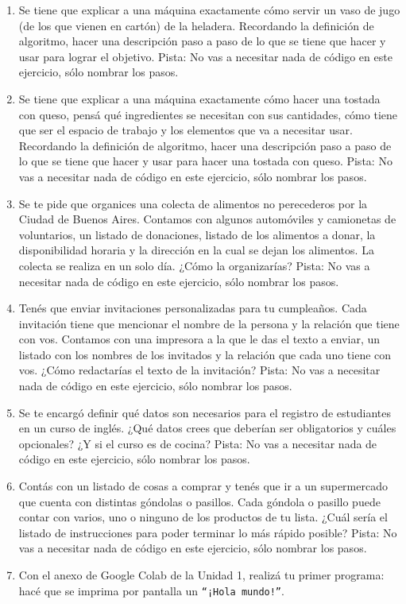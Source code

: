 \documentclass[
  letterpaper,
  DIV=11,
  numbers=noendperiod]{scrreprt}
\begin{document}
\begin{enumerate}
\def\labelenumi{\arabic{enumi}.}
\item
  Se tiene que explicar a una máquina exactamente cómo servir un vaso de
  jugo (de los que vienen en cartón) de la heladera. Recordando la
  definición de algoritmo, hacer una descripción paso a paso de lo que
  se tiene que hacer y usar para lograr el objetivo. Pista: No vas a
  necesitar nada de código en este ejercicio, sólo nombrar los pasos.
\item
  Se tiene que explicar a una máquina exactamente cómo hacer una tostada
  con queso, pensá qué ingredientes se necesitan con sus cantidades,
  cómo tiene que ser el espacio de trabajo y los elementos que va a
  necesitar usar. Recordando la definición de algoritmo, hacer una
  descripción paso a paso de lo que se tiene que hacer y usar para hacer
  una tostada con queso. Pista: No vas a necesitar nada de código en
  este ejercicio, sólo nombrar los pasos.
\item
  Se te pide que organices una colecta de alimentos no perecederos por
  la Ciudad de Buenos Aires. Contamos con algunos automóviles y
  camionetas de voluntarios, un listado de donaciones, listado de los
  alimentos a donar, la disponibilidad horaria y la dirección en la cual
  se dejan los alimentos. La colecta se realiza en un solo día. ¿Cómo la
  organizarías? Pista: No vas a necesitar nada de código en este
  ejercicio, sólo nombrar los pasos.
\item
  Tenés que enviar invitaciones personalizadas para tu cumpleaños. Cada
  invitación tiene que mencionar el nombre de la persona y la relación
  que tiene con vos. Contamos con una impresora a la que le das el texto
  a enviar, un listado con los nombres de los invitados y la relación
  que cada uno tiene con vos. ¿Cómo redactarías el texto de la
  invitación? Pista: No vas a necesitar nada de código en este
  ejercicio, sólo nombrar los pasos.
\item
  Se te encargó definir qué datos son necesarios para el registro de
  estudiantes en un curso de inglés. ¿Qué datos crees que deberían ser
  obligatorios y cuáles opcionales? ¿Y si el curso es de cocina? Pista:
  No vas a necesitar nada de código en este ejercicio, sólo nombrar los
  pasos.
\item
  Contás con un listado de cosas a comprar y tenés que ir a un
  supermercado que cuenta con distintas góndolas o pasillos. Cada
  góndola o pasillo puede contar con varios, uno o ninguno de los
  productos de tu lista. ¿Cuál sería el listado de instrucciones para
  poder terminar lo más rápido posible? Pista: No vas a necesitar nada
  de código en este ejercicio, sólo nombrar los pasos.
\item
  Con el anexo de Google Colab de la Unidad 1, realizá tu primer
  programa: hacé que se imprima por pantalla un
  \texttt{“¡Hola\ mundo!”}.
\end{enumerate}
\end{document}
